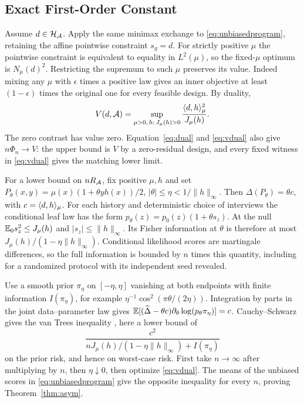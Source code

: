 \subsection{Exact First-Order Constant}
Assume $d\in\mathcal H_\mathcal A$. Apply the same minimax exchange to \eqref{eq:unbiasedprogram}, retaining the affine pointwise constraint $s_g=d$. For strictly positive $\mu$ the pointwise constraint is equivalent to equality in $L^2(\mu)$, so the fixed-$\mu$ optimum is $N_\mu(d)^2$. Restricting the supremum to such $\mu$ preserves its value. Indeed mixing any $\mu$ with $\epsilon$ times a positive law gives an inner objective at least $(1-\epsilon)$ times the original one for every feasible design. By duality,
\begin{equation}
 V(d,\mathcal A)=\sup_{\mu>0,\,h:\,J_\mu(h)>0}
                \frac{\langle d,h\rangle_\mu^2}{J_\mu(h)}.\label{eq:vdual}
\end{equation}
The zero contrast has value zero. Equation~\eqref{eq:dual} and \eqref{eq:vdual} also give $n\Phi_n\to V$: the upper bound is $V$ by a zero-residual design, and every fixed witness in \eqref{eq:vdual} gives the matching lower limit.

For a lower bound on $nR_\mathcal A$, fix positive $\mu,h$ and set $P_\theta(x,y)=\mu(x)(1+\theta y h(x))/2$, $|\theta|\le\eta<1/\|h\|_\infty$. Then $\Delta(P_\theta)=\theta c$, with $c=\langle d,h\rangle_\mu$. For each history and deterministic choice of interviews the conditional leaf law has the form $p_\theta(z)=p_0(z)(1+\theta s_z)$. At the null $\mathbb{E}_0s_z^2\le J_\mu(h)$ and $|s_z|\le\|h\|_\infty$. Its Fisher information at $\theta$ is therefore at most $J_\mu(h)/(1-\eta\|h\|_\infty)$. Conditional likelihood scores are martingale differences, so the full information is bounded by $n$ times this quantity, including for a randomized protocol with its independent seed revealed.

Use a smooth prior $\pi_\eta$ on $[-\eta,\eta]$ vanishing at both endpoints with finite information $I(\pi_\eta)$, for example $\eta^{-1}\cos^2(\pi \theta/(2\eta))$. Integration by parts in the joint data--parameter law gives $\mathbb{E}[(\widehat\Delta-\theta c)\partial_\theta\log(p_\theta\pi_\eta)]=c$. Cauchy--Schwarz gives the van Trees inequality \citep{gill1995}, here a lower bound of
\[
     \frac{c^2}{nJ_\mu(h)/(1-\eta\|h\|_\infty)+I(\pi_\eta)}
\]
on the prior risk, and hence on worst-case risk. First take $n\to\infty$ after multiplying by $n$, then $\eta\downarrow0$, then optimize \eqref{eq:vdual}. The means of the unbiased scores in \eqref{eq:unbiasedprogram} give the opposite inequality for every $n$, proving Theorem~\ref{thm:asym}.

